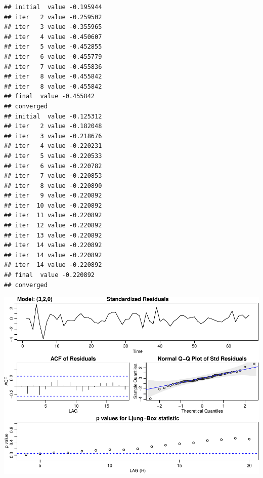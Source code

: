\documentclass[]{article}
\newenvironment{Shaded}{\begin{snugshade}}{\end{snugshade}}
\newcommand{\DataTypeTok}[1]{\textcolor[rgb]{0.13,0.29,0.53}{#1}}
\newcommand{\DecValTok}[1]{\textcolor[rgb]{0.00,0.00,0.81}{#1}}
\newcommand{\KeywordTok}[1]{\textcolor[rgb]{0.13,0.29,0.53}{\textbf{#1}}}
\newcommand{\NormalTok}[1]{#1}
\newcommand{\OperatorTok}[1]{\textcolor[rgb]{0.81,0.36,0.00}{\textbf{#1}}}
\newcommand{\StringTok}[1]{\textcolor[rgb]{0.31,0.60,0.02}{#1}}
\begin{document}
\begin{verbatim}
## initial  value -0.195944 
## iter   2 value -0.259502
## iter   3 value -0.355965
## iter   4 value -0.450607
## iter   5 value -0.452855
## iter   6 value -0.455779
## iter   7 value -0.455836
## iter   8 value -0.455842
## iter   8 value -0.455842
## final  value -0.455842 
## converged
## initial  value -0.125312 
## iter   2 value -0.182048
## iter   3 value -0.218676
## iter   4 value -0.220231
## iter   5 value -0.220533
## iter   6 value -0.220782
## iter   7 value -0.220853
## iter   8 value -0.220890
## iter   9 value -0.220892
## iter  10 value -0.220892
## iter  11 value -0.220892
## iter  12 value -0.220892
## iter  13 value -0.220892
## iter  14 value -0.220892
## iter  14 value -0.220892
## iter  14 value -0.220892
## final  value -0.220892 
## converged
\end{verbatim}

\begin{center}\includegraphics{Q5_files/figure-latex/unnamed-chunk-10-1} \end{center}

\begin{Shaded}
\end{Shaded}
\end{document}
